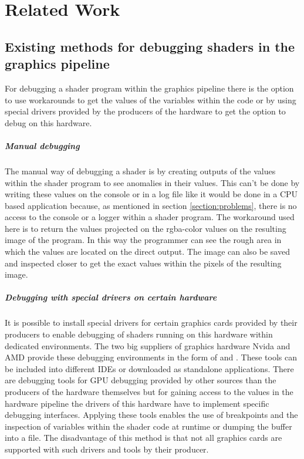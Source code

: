 
\chapter{Related Work}\label{cha:RelatedWork}
\section{Existing methods for debugging shaders in the graphics pipeline}
\label{section:debuggingMethods}

For debugging a shader program within the graphics pipeline there is the option to use workarounds to get the values of the variables within the code or by using special drivers provided by the producers of the hardware to get the option to debug on this hardware.

\paragraph{Manual debugging}

The manual way of debugging a shader is by creating outputs of the values within the shader program to see anomalies in their values. This can't be done by writing these values on the console or in a log file like it would be done in a CPU based application because, as mentioned in section \ref{section:problems}, there is no access to the console or a logger within a shader program. The workaround used here is to return the values projected on the rgba-color values on the resulting image of the program. In this way the programmer can see the rough area in which the values are located on the direct output. The image can also be saved and inspected closer to get the exact values within the pixels of the resulting image.

\paragraph{Debugging with special drivers on certain hardware}
\label{section:debuggingMethods_drivers}

It is possible to install special drivers for certain graphics cards provided by their producers to enable debugging of shaders running on this hardware within dedicated environments. The two big suppliers of graphics hardware Nvida and AMD provide these debugging environments in the form of \cite{Nvidia_Nsight} and \cite{AMD_GPUPerfStudio}. These tools can be included into different IDEs or downloaded as standalone applications. There are debugging tools for GPU debugging provided by other sources than the producers of the hardware themselves but for gaining access to the values in the hardware pipeline the drivers of this hardware have to implement specific debugging interfaces. Applying these tools enables the use of breakpoints and the inspection of variables within the shader code at runtime or dumping the buffer into a file. The disadvantage of this method is that not all graphics cards are supported with such drivers and tools by their producer.

